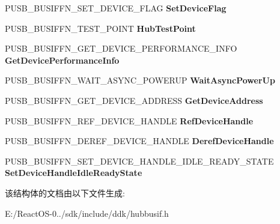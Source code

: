 \begin{DoxyCompactItemize}
\item 
\mbox{\label{struct___u_s_b___b_u_s___i_n_t_e_r_f_a_c_e___h_u_b___v6_a63c720729d8ef90e6f37bb6f2cac6107}} 
P\+U\+S\+B\+\_\+\+B\+U\+S\+I\+F\+F\+N\+\_\+\+S\+E\+T\+\_\+\+D\+E\+V\+I\+C\+E\+\_\+\+F\+L\+AG {\bfseries Set\+Device\+Flag}
\item 
\mbox{\label{struct___u_s_b___b_u_s___i_n_t_e_r_f_a_c_e___h_u_b___v6_a626d789633b11f057cdbc5fca8316b37}} 
P\+U\+S\+B\+\_\+\+B\+U\+S\+I\+F\+F\+N\+\_\+\+T\+E\+S\+T\+\_\+\+P\+O\+I\+NT {\bfseries Hub\+Test\+Point}
\item 
\mbox{\label{struct___u_s_b___b_u_s___i_n_t_e_r_f_a_c_e___h_u_b___v6_a32bc6811e740ba867ddac4f67961f82f}} 
P\+U\+S\+B\+\_\+\+B\+U\+S\+I\+F\+F\+N\+\_\+\+G\+E\+T\+\_\+\+D\+E\+V\+I\+C\+E\+\_\+\+P\+E\+R\+F\+O\+R\+M\+A\+N\+C\+E\+\_\+\+I\+N\+FO {\bfseries Get\+Device\+Performance\+Info}
\item 
\mbox{\label{struct___u_s_b___b_u_s___i_n_t_e_r_f_a_c_e___h_u_b___v6_a60f8e8365a46b13c5f490b1bd95854ba}} 
P\+U\+S\+B\+\_\+\+B\+U\+S\+I\+F\+F\+N\+\_\+\+W\+A\+I\+T\+\_\+\+A\+S\+Y\+N\+C\+\_\+\+P\+O\+W\+E\+R\+UP {\bfseries Wait\+Async\+Power\+Up}
\item 
\mbox{\label{struct___u_s_b___b_u_s___i_n_t_e_r_f_a_c_e___h_u_b___v6_ae9bcb071a05b680d738f1e1205637dc3}} 
P\+U\+S\+B\+\_\+\+B\+U\+S\+I\+F\+F\+N\+\_\+\+G\+E\+T\+\_\+\+D\+E\+V\+I\+C\+E\+\_\+\+A\+D\+D\+R\+E\+SS {\bfseries Get\+Device\+Address}
\item 
\mbox{\label{struct___u_s_b___b_u_s___i_n_t_e_r_f_a_c_e___h_u_b___v6_aef71f7744a163d90734a1581995f0547}} 
P\+U\+S\+B\+\_\+\+B\+U\+S\+I\+F\+F\+N\+\_\+\+R\+E\+F\+\_\+\+D\+E\+V\+I\+C\+E\+\_\+\+H\+A\+N\+D\+LE {\bfseries Ref\+Device\+Handle}
\item 
\mbox{\label{struct___u_s_b___b_u_s___i_n_t_e_r_f_a_c_e___h_u_b___v6_ad0a05f544f9c93eddb70e13b55bb10e4}} 
P\+U\+S\+B\+\_\+\+B\+U\+S\+I\+F\+F\+N\+\_\+\+D\+E\+R\+E\+F\+\_\+\+D\+E\+V\+I\+C\+E\+\_\+\+H\+A\+N\+D\+LE {\bfseries Deref\+Device\+Handle}
\item 
\mbox{\label{struct___u_s_b___b_u_s___i_n_t_e_r_f_a_c_e___h_u_b___v6_ac682a7885fb0dae401119371a24c0969}} 
P\+U\+S\+B\+\_\+\+B\+U\+S\+I\+F\+F\+N\+\_\+\+S\+E\+T\+\_\+\+D\+E\+V\+I\+C\+E\+\_\+\+H\+A\+N\+D\+L\+E\+\_\+\+I\+D\+L\+E\+\_\+\+R\+E\+A\+D\+Y\+\_\+\+S\+T\+A\+TE {\bfseries Set\+Device\+Handle\+Idle\+Ready\+State}
\end{DoxyCompactItemize}


该结构体的文档由以下文件生成\+:\begin{DoxyCompactItemize}
\item 
E\+:/\+React\+O\+S-\/0../sdk/include/ddk/hubbusif.\+h\end{DoxyCompactItemize}
